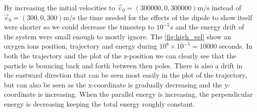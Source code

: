 \documentclass[x11names]{article}
\renewcommand{\va}{\vec}
\begin{document}
    By increasing the initial velocities to \(\va{v}_0 = (300000, 0, 300000) \si{\meter \per \second}\) instead of \(\va{v}_0 = (300, 0, 300) \si{\meter \per \second}\) the time needed for the effects of the dipole to show itself were shorter so we could decrease the timestep to \(10^{-5} \si{s}\) and the energy drift of the system were small enough to mostly ignore. The \cref{fig:high_vel} show an oxygen ions position, trajectory and energy during \(10^8\times 10^{-5} = 10000 \) seconds. In both the trajectory and the plot of the z-position we can clearly see that the particle is bouncing back and forth between then poles. There is also a drift in the eastward direction that can be seen most easily in the plot of the trajectory, but can also be seen as the x-coordinate is gradually decreasing and the y-coordinate is increasing.     When the parallel energy is increasing, the perpendicular energy is decreasing keeping the total energy roughly constant.
\end{document}
